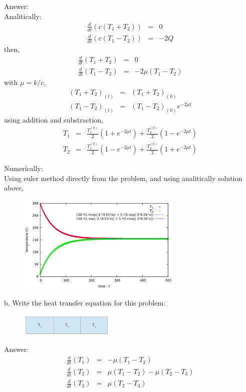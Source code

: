 \documentclass[paper=a4, fontsize=11pt]{scrartcl}
\numberwithin{equation}{section} %
\numberwithin{figure}{section} %
\numberwithin{table}{section} %
\begin{document}
Answer:\\
Analitically:\\
\begin{eqnarray*}
\frac{d}{dt}(c(T_1 + T_2)) &=& 0\\
\frac{d}{dt}(c(T_1 - T_2)) &=& -2Q
\end{eqnarray*}
then,
\begin{eqnarray*}
\frac{d}{dt}(T_1 + T_2) &=& 0\\
\frac{d}{dt}(T_1 - T_2) &=& -2\mu(T_1 - T_2)
\end{eqnarray*}
with $\mu = k/c$,
\begin{eqnarray*}
(T_1 + T_2)_{(t)} &=& (T_1 + T_2)_{(0)}\\
(T_1 - T_2)_{(t)} &=& (T_1 - T_2)_{(0)} e^{-2 \mu t}
\end{eqnarray*}
using addition and substraction,
\begin{eqnarray*}
T_1 &=& \frac{T_1^{(0)}}{2} \left( 1 + e^{-2 \mu t} \right) + \frac{T_2^{(0)}}{2} \left( 1 - e^{-2 \mu t} \right)\\
T_2 &=& \frac{T_1^{(0)}}{2} \left( 1 - e^{-2 \mu t} \right) + \frac{T_2^{(0)}}{2} \left( 1 + e^{-2 \mu t} \right)
\end{eqnarray*}

\newpage
Numerically:\\
Using euler method directly from the problem, and using analitically solution above,
\begin{figure}
	\centering
	\includegraphics[width=0.7\textwidth]{num.png}
\end{figure}


b. Write the heat transfer equation for this problem:
\begin{figure}
	\centering
	\includegraphics[width=0.4\textwidth]{2b.png}
\end{figure}
Answer:
\begin{eqnarray*}
\frac{d}{dt}(T_1) &=& - \mu(T_1 - T_2)\\
\frac{d}{dt}(T_2) &=& \mu(T_1 - T_2) - \mu(T_2 - T_3)\\
\frac{d}{dt}(T_3) &=& \mu(T_2 - T_3)
\end{eqnarray*}
\end{document}
